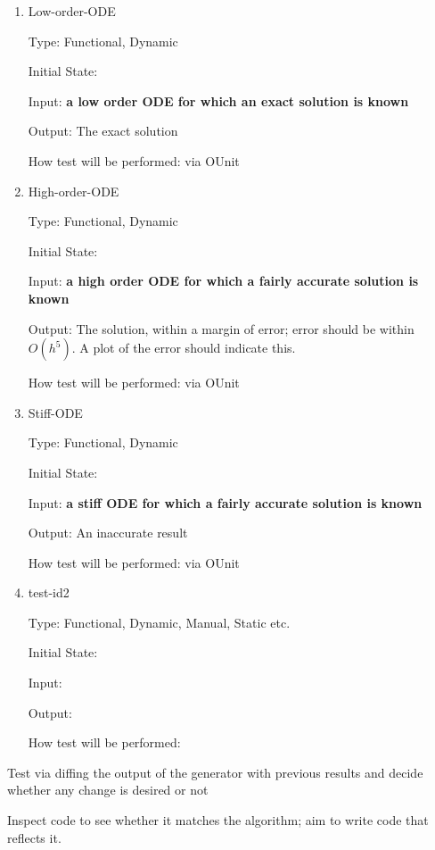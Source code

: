 \documentclass[12pt, titlepage]{article}
\begin{document}
\begin{enumerate}

\item{Low-order-ODE\\}

Type: Functional, Dynamic
					
Initial State: 
					
Input: \textbf{a low order ODE for which an exact solution is known}
					
Output: The exact solution
					
How test will be performed: via OUnit
					
\item{High-order-ODE\\}

Type: Functional, Dynamic

Initial State: 

Input: \textbf{a high order ODE for which a fairly accurate solution is known}

Output: The solution, within a margin of error; error should be within 
$O(h^5)$. A plot of the error should indicate this.

How test will be performed: via OUnit

\item{Stiff-ODE\\}

Type: Functional, Dynamic

Initial State: 

Input: \textbf{a stiff ODE for which a fairly accurate solution is known}

Output: An inaccurate result

How test will be performed: via OUnit


\item{test-id2\\}

Type: Functional, Dynamic, Manual, Static etc.
					
Initial State: 
					
Input: 
					
Output: 
					
How test will be performed: 

\end{enumerate}

Test via diffing the output of the generator with previous results and decide 
whether any change is desired or not

Inspect code to see whether it matches the algorithm; aim to write code that 
reflects it.
\end{document}
